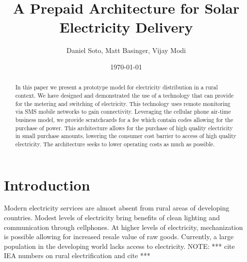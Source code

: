 \documentclass[conference]{IEEEtran}
\newcommand{\note}[1]{{\color{red} NOTE: *** #1 ***}}
\begin{document}
\title{A Prepaid Architecture for Solar Electricity Delivery}
\author{{Daniel Soto}, Matt Basinger, Vijay Modi}
\date{\today}
\maketitle

\begin{abstract}
In this paper we present a prototype model for electricity
distribution in a rural context.
We have designed and demonstrated the use of a technology that
can provide for the metering and switching of electricity.
This technology uses remote monitoring via SMS mobile networks
to gain connectivity.
Leveraging the cellular phone air-time business model, we provide
scratchcards for a fee which contain codes allowing for the purchase of
power.
This architecture allows for the purchase of high quality electricity in
small purchase amounts, lowering the consumer cost barrier to access of
high quality electricity.
The architecture seeks to lower operating costs as much as possible.
\end{abstract}

\section{Introduction}
Modern electricity services are almost absent from rural
areas of developing countries.
Modest levels of electricity bring benefits of clean lighting
and communication through cellphones.
At higher levels of electricity, mechanization is possible
allowing for increased resale value of raw goods.
Currently, a large population in the developing world 
lacks access to electricity.
\note{cite IEA numbers on rural electrification and cite}
\end{document}
